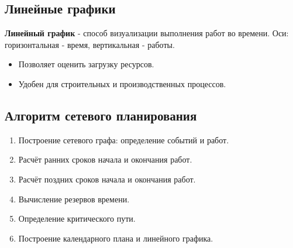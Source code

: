 {\subsection*{Линейные графики}

\textbf{Линейный график} - способ визуализации выполнения работ во времени.  
Оси: горизонтальная - время, вертикальная - работы.

\begin{itemize}
  \item Позволяет оценить загрузку ресурсов.
  \item Удобен для строительных и производственных процессов.
\end{itemize}

\subsection*{Алгоритм сетевого планирования}

\begin{enumerate}
  \item Построение сетевого графа: определение событий и работ.
  \item Расчёт ранних сроков начала и окончания работ.
  \item Расчёт поздних сроков начала и окончания работ.
  \item Вычисление резервов времени.
  \item Определение критического пути.
  \item Построение календарного плана и линейного графика.
\end{enumerate}


    \newpage
}
